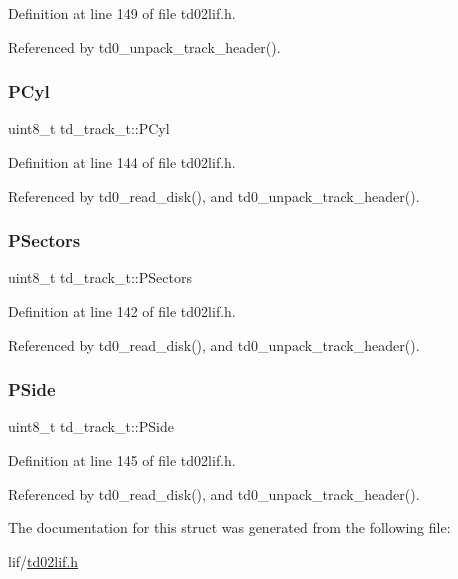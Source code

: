 Definition at line 149 of file td02lif.\+h.



Referenced by td0\+\_\+unpack\+\_\+track\+\_\+header().

\mbox{\label{structtd__track__t_a479a4bf60fcfdcbca513ebdea33b8e8c}} 
\subsubsection{\texorpdfstring{P\+Cyl}{PCyl}}
{\footnotesize\ttfamily uint8\+\_\+t td\+\_\+track\+\_\+t\+::\+P\+Cyl}



Definition at line 144 of file td02lif.\+h.



Referenced by td0\+\_\+read\+\_\+disk(), and td0\+\_\+unpack\+\_\+track\+\_\+header().

\mbox{\label{structtd__track__t_a8f8ba7a0392f869f062f46d50a11bdfa}} 
\subsubsection{\texorpdfstring{P\+Sectors}{PSectors}}
{\footnotesize\ttfamily uint8\+\_\+t td\+\_\+track\+\_\+t\+::\+P\+Sectors}



Definition at line 142 of file td02lif.\+h.



Referenced by td0\+\_\+read\+\_\+disk(), and td0\+\_\+unpack\+\_\+track\+\_\+header().

\mbox{\label{structtd__track__t_af2074402835d514cbf7f5f40e25fa284}} 
\subsubsection{\texorpdfstring{P\+Side}{PSide}}
{\footnotesize\ttfamily uint8\+\_\+t td\+\_\+track\+\_\+t\+::\+P\+Side}



Definition at line 145 of file td02lif.\+h.



Referenced by td0\+\_\+read\+\_\+disk(), and td0\+\_\+unpack\+\_\+track\+\_\+header().



The documentation for this struct was generated from the following file\+:\begin{DoxyCompactItemize}
\item 
lif/\hyperlink{td02lif_8h}{td02lif.\+h}\end{DoxyCompactItemize}
